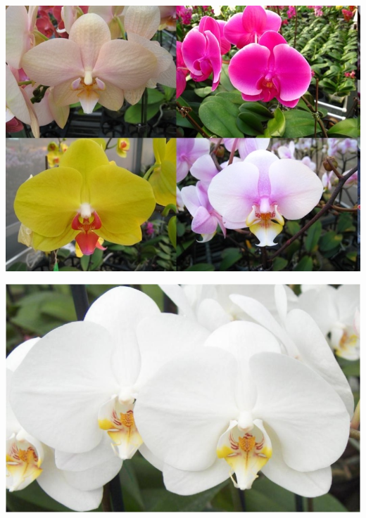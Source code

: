 \documentclass{article}
\begin{document}
\begin{center}
\includegraphics[height=0.925\paperheight]{../Orchid_Phalaenopsis_(MothOrchid).jpg}
\end{center}
\newpage

\begin{center}
\includegraphics[height=0.925\paperheight]{../Orchid_Phalaenopsis_(MothOrchid)2.jpg}
\end{center}
\newpage
\end{document}
